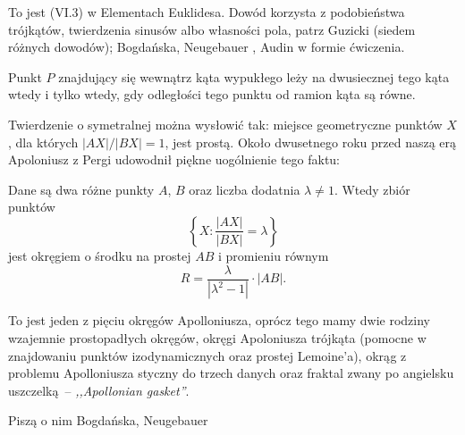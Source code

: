 To jest (VI.3) w Elementach Euklidesa.
Dowód korzysta z podobieństwa trójkątów, twierdzenia sinusów albo własności pola, patrz Guzicki \cite[s. 120]{guzicki_2021} (siedem różnych dowodów); Bogdańska, Neugebauer \cite[s. 73]{neugebauer_2018}, Audin \cite[s. 102]{audin_2003} w formie ćwiczenia.

\begin{proposition} %
	Punkt $P$ znajdujący się wewnątrz kąta wypukłego leży na dwusiecznej tego kąta wtedy i tylko wtedy, gdy odległości tego punktu od ramion kąta są równe.
\end{proposition}




Twierdzenie o symetralnej %
można wysłowić tak: miejsce geometryczne punktów $X$, dla których $|AX|/|BX| = 1$, jest prostą.
Około dwusetnego roku przed naszą erą Apoloniusz z Pergi udowodnił piękne uogólnienie tego faktu:

\begin{definition} %
	Dane są dwa różne punkty $A$, $B$ oraz liczba dodatnia $\lambda \neq 1$.
	Wtedy zbiór punktów 
	\begin{equation}
		\left\{X : \frac{|AX|}{|BX|} = \lambda \right\}
	\end{equation}
	jest okręgiem o środku na prostej $AB$ i promieniu równym
	\begin{equation}
		R = \frac{\lambda}{|\lambda^2 - 1|} \cdot |AB|.
	\end{equation}
\end{definition}

To jest jeden z pięciu okręgów Apolloniusza, oprócz tego mamy dwie rodziny wzajemnie prostopadłych okręgów, okręgi Apoloniusza trójkąta (pomocne w znajdowaniu punktów izodynamicznych oraz prostej Lemoine'a), okrąg z problemu Apolloniusza styczny do trzech danych oraz fraktal zwany po angielsku uszczelką -- \emph{,,Apollonian gasket''}.

Piszą o nim Bogdańska, Neugebauer \cite[s. 74]{neugebauer_2018}



